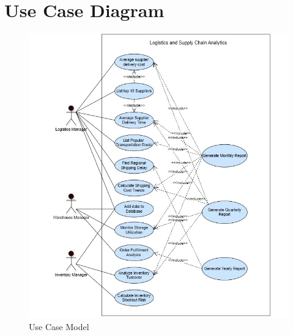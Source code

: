 	\section{Use Case Diagram}
\begin{figure}[h]
	\centering
	\includegraphics[width=1\textwidth]{UML.jpg} 
	\caption{Use Case Model}
	\label{fig:Use Case Model}
\end{figure}

